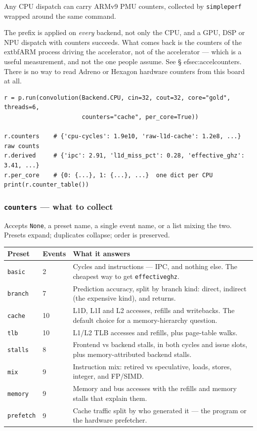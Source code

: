 \documentclass[11pt,a4paper]{article}
\newcommand{\code}[1]{\texttt{\let\_\breakableunderscore #1}}
\newcommand{\breakableunderscore}{\textunderscore\allowbreak}
\begin{document}
Any CPU dispatch can carry ARMv9 PMU counters, collected by \code{simpleperf}
wrapped around the same command.

The prefix is applied on \emph{every} backend, not only the CPU, and a GPU,
DSP or NPU dispatch with counters succeeds. What comes back is the counters of
the 	extbf{ARM process driving the accelerator}, not of the accelerator ---
which is a useful measurement, and not the one people assume. See
\S
ef{sec:accelcounters}. There is no way to read Adreno or Hexagon hardware
counters from this board at all.

\begin{lstlisting}
r = p.run(convolution(Backend.CPU, cin=32, cout=32, core="gold", threads=6,
                      counters="cache", per_core=True))

r.counters    # {'cpu-cycles': 1.9e10, 'raw-l1d-cache': 1.2e8, ...}  raw counts
r.derived     # {'ipc': 2.91, 'l1d_miss_pct': 0.28, 'effective_ghz': 3.41, ...}
r.per_core    # {0: {...}, 1: {...}, ...}  one dict per CPU
print(r.counter_table())
\end{lstlisting}

\subsubsection*{\texttt{counters} --- what to collect}

Accepts \code{None}, a preset name, a single event name, or a list mixing the
two. Presets expand; duplicates collapse; order is preserved.

\begin{longtable}{@{}p{1.9cm}p{1.1cm}p{11.6cm}@{}}
\toprule
\textbf{Preset} & \textbf{Events} & \textbf{What it answers} \\
\midrule
\endhead
\code{basic} & 2 & Cycles and instructions --- IPC, and nothing else. The
  cheapest way to get \code{effective\_ghz}. \\
\code{branch} & 7 & Prediction accuracy, split by branch kind: direct, indirect
  (the expensive kind), and returns. \\
\code{cache} & 10 & L1D, L1I and L2 accesses, refills and writebacks. The
  default choice for a memory-hierarchy question. \\
\code{tlb} & 10 & L1/L2 TLB accesses and refills, plus page-table walks. \\
\code{stalls} & 8 & Frontend vs backend stalls, in both cycles and issue slots,
  plus memory-attributed backend stalls. \\
\code{mix} & 9 & Instruction mix: retired vs speculative, loads, stores,
  integer, and FP/SIMD. \\
\code{memory} & 9 & Memory and bus accesses with the refills and memory stalls
  that explain them. \\
\code{prefetch} & 9 & Cache traffic split by who generated it --- the program or
  the hardware prefetcher. \\
\bottomrule
\end{longtable}
\end{document}
